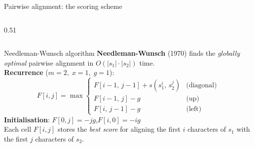 \documentclass[aspectratio=169,t]{beamer}
\begin{document}
\begin{frame}[shrink=5]{Pairwise alignment: the scoring scheme}
\begin{columns}[T]
\begin{column}{0.51\textwidth}
\begin{center}
      \end{center}
    \end{column}
  \end{columns}
\end{frame}

\begin{frame}[shrink=5]{Needleman-Wunsch algorithm}
  \textbf{Needleman-Wunsch} (1970) finds the \emph{globally optimal} pairwise alignment in $O(|s_1| \cdot |s_2|)$ time.\\[0.3cm]
  \textbf{Recurrence} ($m{=}2,\; x{=}1,\; g{=}1$):
  \[
    F[i,j] = \max \begin{cases}
      F[i{-}1,\,j{-}1] + s(s_1^i,\, s_2^j) & \text{(diagonal)}\\
      F[i{-}1,\,j] - g                        & \text{(up)}\\
      F[i,\,j{-}1] - g                        & \text{(left)}
    \end{cases}
  \]
  \textbf{Initialisation}: $F[0,j] = -jg$,\quad $F[i,0] = -ig$\\[0.3cm]
  Each cell $F[i,j]$ stores the \emph{best score} for aligning the first $i$ characters of $s_1$ with the first $j$ characters of $s_2$.
\end{frame}
\end{document}
